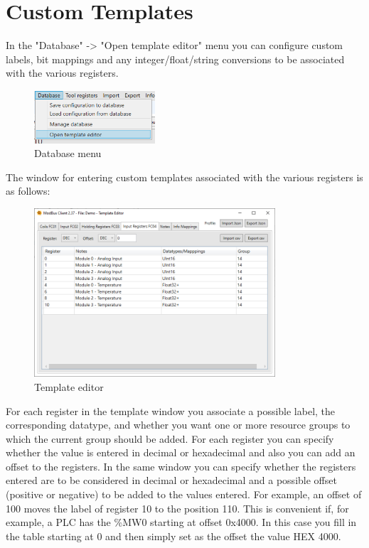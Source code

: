
\chapter{Custom Templates}
\label{template}

In the "Database" -> "Open template editor" menu you can configure custom labels, bit
mappings and any integer/float/string conversions to be associated with the various registers.

\begin{figure}[H]
    \centering
    \includegraphics[width=0.4\textwidth]{../Img/Menu_Database.PNG}
    \caption{Database menu}
\end{figure}

The window for entering custom templates associated with the various registers is as follows:

\begin{figure}[H]
\centering
\includegraphics[width=0.80\textwidth]{../Img/ModBus_Client_Template_00.PNG}
\caption{Template editor}
\end{figure}

For each register in the template window you associate a possible label, the corresponding datatype,
and whether you want one or more resource groups to which the current group should be added.
For each register you can specify whether the value is entered in 
decimal or hexadecimal and also you can add an offset 
to the registers. In the same window you can specify whether the registers entered
are to be considered in decimal or hexadecimal and a possible offset (positive or negative)
to be added to the values entered.
For example, an offset of 100 moves the label of register 10 to the
position 110. This is convenient if, for example, a PLC has the \%MW0 starting at offset
0x4000. In this case you fill in the table starting at 0 and then simply set as the
offset the value HEX 4000.

